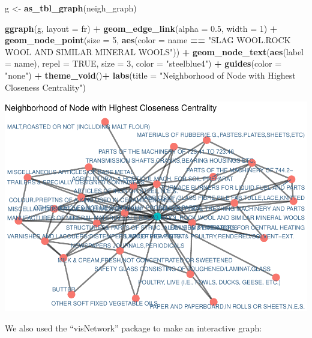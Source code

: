 \documentclass[
]{article}
\newenvironment{Shaded}{\begin{snugshade}}{\end{snugshade}}
\newcommand{\AttributeTok}[1]{\textcolor[rgb]{0.13,0.29,0.53}{#1}}
\newcommand{\ConstantTok}[1]{\textcolor[rgb]{0.56,0.35,0.01}{#1}}
\newcommand{\DecValTok}[1]{\textcolor[rgb]{0.00,0.00,0.81}{#1}}
\newcommand{\FloatTok}[1]{\textcolor[rgb]{0.00,0.00,0.81}{#1}}
\newcommand{\FunctionTok}[1]{\textcolor[rgb]{0.13,0.29,0.53}{\textbf{#1}}}
\newcommand{\NormalTok}[1]{#1}
\newcommand{\OtherTok}[1]{\textcolor[rgb]{0.56,0.35,0.01}{#1}}
\newcommand{\SpecialCharTok}[1]{\textcolor[rgb]{0.81,0.36,0.00}{\textbf{#1}}}
\newcommand{\StringTok}[1]{\textcolor[rgb]{0.31,0.60,0.02}{#1}}
\begin{document}
\begin{Shaded}
\begin{Highlighting}[]
\NormalTok{g }\OtherTok{\textless{}{-}} \FunctionTok{as\_tbl\_graph}\NormalTok{(neigh\_graph)}

\FunctionTok{ggraph}\NormalTok{(g, }\AttributeTok{layout =} \StringTok{\textquotesingle{}fr\textquotesingle{}}\NormalTok{) }\SpecialCharTok{+}
  \FunctionTok{geom\_edge\_link}\NormalTok{(}\AttributeTok{alpha =} \FloatTok{0.5}\NormalTok{, }\AttributeTok{width =} \DecValTok{1}\NormalTok{) }\SpecialCharTok{+}
  \FunctionTok{geom\_node\_point}\NormalTok{(}\AttributeTok{size =} \DecValTok{5}\NormalTok{, }\FunctionTok{aes}\NormalTok{(}\AttributeTok{color =}\NormalTok{ name }\SpecialCharTok{==} \StringTok{"SLAG WOOL.ROCK WOOL AND SIMILAR MINERAL WOOLS"}\NormalTok{)) }\SpecialCharTok{+}
  \FunctionTok{geom\_node\_text}\NormalTok{(}\FunctionTok{aes}\NormalTok{(}\AttributeTok{label =}\NormalTok{ name), }\AttributeTok{repel =} \ConstantTok{TRUE}\NormalTok{, }\AttributeTok{size =} \DecValTok{3}\NormalTok{, }\AttributeTok{color =} \StringTok{"steelblue4"}\NormalTok{) }\SpecialCharTok{+}
  \FunctionTok{guides}\NormalTok{(}\AttributeTok{color =} \StringTok{"none"}\NormalTok{) }\SpecialCharTok{+}    
  \FunctionTok{theme\_void}\NormalTok{()}\SpecialCharTok{+}
  \FunctionTok{labs}\NormalTok{(}\AttributeTok{title =} \StringTok{"Neighborhood of Node with Highest Closeness Centrality"}\NormalTok{)}
\end{Highlighting}
\end{Shaded}

\includegraphics{export-network_files/figure-latex/unnamed-chunk-16-2.pdf}

We also used the ``visNetwork'' package to make an interactive graph:
\end{document}
